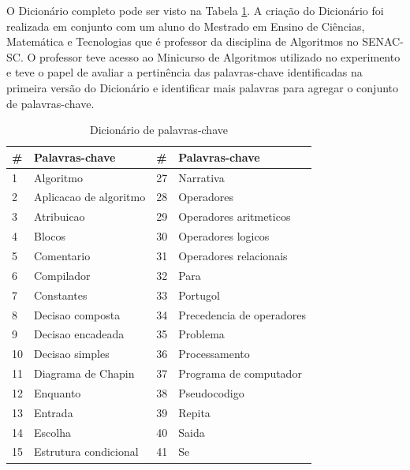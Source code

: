 O Dicionário completo pode ser visto na Tabela \ref{tab:dicionario-palavras-chave}. A criação do Dicionário foi realizada
em conjunto com um aluno do Mestrado em Ensino de Ciências, Matemática e Tecnologias que é professor da disciplina de
Algoritmos no SENAC-SC. O professor teve acesso ao Minicurso de Algoritmos utilizado no experimento
e teve o papel de avaliar a pertinência das palavras-chave identificadas na primeira versão do Dicionário e identificar
mais palavras para agregar o conjunto de palavras-chave.

\begin{table}[h]
\footnotesize
\caption[Dicionário de palavras-chave]{Dicionário de palavras-chave}
\label{tab:dicionario-palavras-chave}
\centering
\begin{tabular}{|p{2cm}|p{4cm}|p{2cm}|p{4cm}|}
\hline
\textbf{\#} & \textbf{Palavras-chave}            & \textbf{\#} & \textbf{Palavras-chave}           \\
\hline
1  & Algoritmo                 & 27 & Narrativa                \\
\hline
2  & Aplicacao de algoritmo    & 28 & Operadores               \\
\hline
3  & Atribuicao                & 29 & Operadores aritmeticos   \\
\hline
4  & Blocos                    & 30 & Operadores logicos       \\
\hline
5  & Comentario                & 31 & Operadores relacionais   \\
\hline
6  & Compilador                & 32 & Para                     \\
\hline
7  & Constantes                & 33 & Portugol                 \\
\hline
8  & Decisao composta          & 34 & Precedencia de operadores\\
\hline
9  & Decisao encadeada         & 35 & Problema                 \\
\hline
10 & Decisao simples           & 36 & Processamento            \\
\hline
11 & Diagrama de Chapin        & 37 & Programa de computador   \\
\hline
12 & Enquanto                  & 38 & Pseudocodigo             \\
\hline
13 & Entrada                   & 39 & Repita                   \\
\hline
14 & Escolha                   & 40 & Saida                    \\
\hline
15 & Estrutura condicional     & 41 & Se                       \\

\end{tabular}
\end{table}

